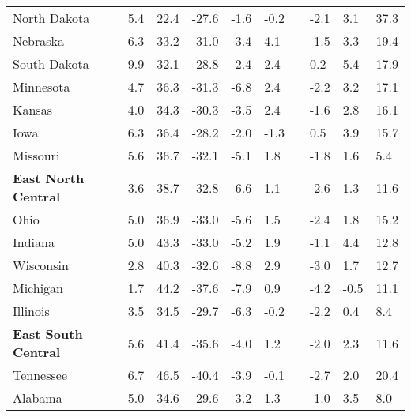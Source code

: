 {\begin{tabular}{p{30mm} R{7mm} R{7mm} R{7mm} R{7mm} 
             R{7mm} p{0mm} R{9mm} R{9mm} R{10mm} }
\hspace{3mm}  North Dakota  & 5.4 & 22.4 & -27.6 & -1.6 & -0.2 &  & -2.1 & 3.1 & 37.3 \\
\hspace{3mm}  Nebraska  & 6.3 & 33.2 & -31.0 & -3.4 & 4.1 &  & -1.5 & 3.3 & 19.4 \\
\hspace{3mm}  South Dakota  & 9.9 & 32.1 & -28.8 & -2.4 & 2.4 &  & 0.2 & 5.4 & 17.9 \\
\hspace{3mm}  Minnesota  & 4.7 & 36.3 & -31.3 & -6.8 & 2.4 &  & -2.2 & 3.2 & 17.1 \\
\hspace{3mm}  Kansas  & 4.0 & 34.3 & -30.3 & -3.5 & 2.4 &  & -1.6 & 2.8 & 16.1 \\
\hspace{3mm}  Iowa  & 6.3 & 36.4 & -28.2 & -2.0 & -1.3 &  & 0.5 & 3.9 & 15.7 \\
\hspace{3mm}  Missouri  & 5.6 & 36.7 & -32.1 & -5.1 & 1.8 &  & -1.8 & 1.6 & 5.4 \\
\hspace{1mm} \textbf{East North Central}  & 3.6 & 38.7 & -32.8 & -6.6 & 1.1 &  & -2.6 & 1.3 & 11.6 \\
\hspace{3mm}  Ohio  & 5.0 & 36.9 & -33.0 & -5.6 & 1.5 &  & -2.4 & 1.8 & 15.2 \\
\hspace{3mm}  Indiana  & 5.0 & 43.3 & -33.0 & -5.2 & 1.9 &  & -1.1 & 4.4 & 12.8 \\
\hspace{3mm}  Wisconsin  & 2.8 & 40.3 & -32.6 & -8.8 & 2.9 &  & -3.0 & 1.7 & 12.7 \\
\hspace{3mm}  Michigan  & 1.7 & 44.2 & -37.6 & -7.9 & 0.9 &  & -4.2 & -0.5 & 11.1 \\
\hspace{3mm}  Illinois  & 3.5 & 34.5 & -29.7 & -6.3 & -0.2 &  & -2.2 & 0.4 & 8.4 \\
\hspace{1mm} \textbf{East South Central}  & 5.6 & 41.4 & -35.6 & -4.0 & 1.2 &  & -2.0 & 2.3 & 11.6 \\
\hspace{3mm}  Tennessee  & 6.7 & 46.5 & -40.4 & -3.9 & -0.1 &  & -2.7 & 2.0 & 20.4 \\
\hspace{3mm}  Alabama  & 5.0 & 34.6 & -29.6 & -3.2 & 1.3 &  & -1.0 & 3.5 & 8.0 \\

\end{tabular}}
